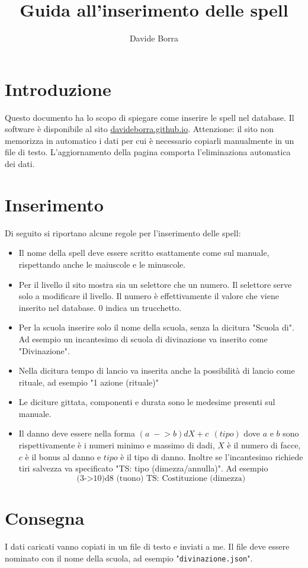 \documentclass[12pt]{article}
\title{Guida all'inserimento delle spell}
\author{Davide Borra}
\begin{document}
    \maketitle
    \section{Introduzione}
    Questo documento ha lo scopo di spiegare come inserire le spell nel database. Il software è disponibile al sito \url{davideborra.github.io}. 
    Attenzione: il sito non memorizza in automatico i dati per cui è necessario copiarli manualmente in un file di testo. L'aggiornamento della pagina comporta l'eliminaziona automatica dei dati. 

    \section{Inserimento}
    Di seguito si riportano alcune regole per l'inserimento delle spell:
    \begin{itemize}
        \item Il nome della spell deve essere scritto esattamente come sul manuale, rispettando anche le maiuscole e le minuscole.
        \item Per il livello il sito mostra sia un selettore che un numero. Il selettore serve solo a modificare il livello. Il numero è effettivamente il valore che viene inserito nel database. 0 indica un trucchetto.
        \item Per la scuola inserire solo il nome della scuola, senza la dicitura "Scuola di". Ad esempio un incantesimo di scuola di divinazione va inserito come "Divinazione".
        \item Nella dicitura tempo di lancio va inserita anche la possibilità di lancio come rituale, ad esempio "1 azione (rituale)"
        \item Le diciture gittata, componenti e durata sono le medesime presenti sul manuale.
        \item Il danno deve essere nella forma $(a\;-\!\!\!>b)dX + c \ \ (tipo)$ dove $a$ e $b$ sono rispettivamente è i numeri minimo e massimo di dadi, $X$ è il numero di facce, $c$ è il bonus al danno e $tipo$ è il tipo di danno. Inoltre se l'incantesimo richiede tiri salvezza va specificato "TS: tipo (dimezza/annulla)". Ad esempio
        \[\text{(3->10)d8 (tuono) TS: Costituzione (dimezza)}\]
    \end{itemize}

    \section{Consegna}
    I dati caricati vanno copiati in un file di testo e inviati a me. Il file deve essere nominato con il nome della scuola, ad esempio "\texttt{divinazione.json}".
\end{document}
